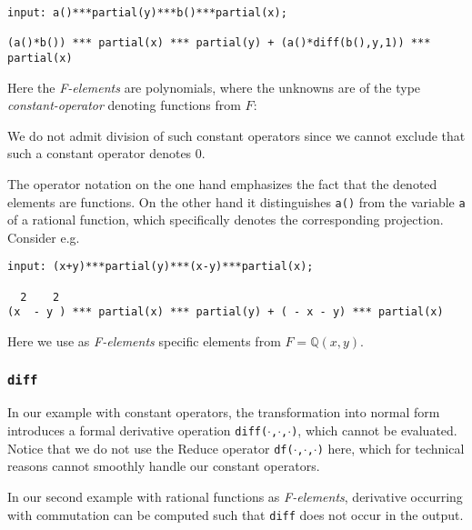 \begin{footnotesize}
\begin{verbatim}
input: a()***partial(y)***b()***partial(x);

(a()*b()) *** partial(x) *** partial(y) + (a()*diff(b(),y,1)) *** partial(x)
\end{verbatim}
\end{footnotesize}
Here the \textit{F-elements} are polynomials, where the unknowns are
of the type \emph{constant-operator} denoting functions from $F$:

\begin{center}
  \begin{ebnf}
  \end{ebnf}
\end{center}
We do not admit division of such constant operators since we cannot
exclude that such a constant operator denotes $0$.

The operator notation on the one hand emphasizes the fact that the
denoted elements are functions. On the other hand it distinguishes
\texttt{a()} from the variable \texttt{a} of a rational function,
which specifically denotes the corresponding projection. Consider e.g.

\begin{footnotesize}
\begin{verbatim}
input: (x+y)***partial(y)***(x-y)***partial(x);

  2    2
(x  - y ) *** partial(x) *** partial(y) + ( - x - y) *** partial(x)
\end{verbatim}
\end{footnotesize}
Here we use as \textit{F-elements} specific elements from $F=\mathbb{Q}(x,y)$.

\subsubsection{\texttt{diff}}
In our example with constant operators, the transformation into normal
form introduces a formal derivative operation
\texttt{diff($\cdot$,$\cdot$,$\cdot$)}, which cannot be evaluated.
Notice that we do not use the Reduce operator
\texttt{df($\cdot$,$\cdot$,$\cdot$)} here, which for technical reasons
cannot smoothly handle our constant operators.

In our second example with rational functions as \textit{F-elements},
derivative occurring with commutation can be computed such that
\texttt{diff} does not occur in the output.

